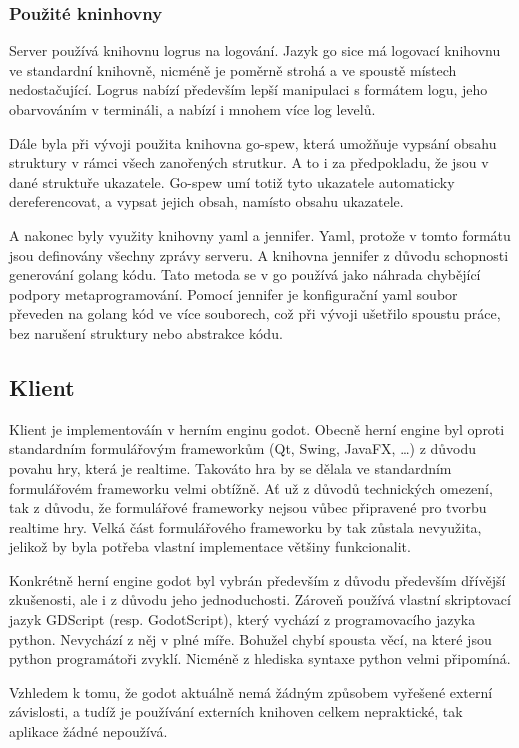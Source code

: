 \documentclass[12pt, a4paper]{article}
\begin{document}
    \subsubsection{Použité kninhovny}
    Server používá knihovnu logrus na logování.
    Jazyk go sice má logovací knihovnu ve standardní knihovně, nicméně je poměrně strohá a ve spoustě místech nedostačující.
    Logrus nabízí především lepší manipulaci s formátem logu, jeho obarvováním v termináli, a nabízí i mnohem více log levelů.

    Dále byla při vývoji použita knihovna go-spew, která umožňuje vypsání obsahu struktury v rámci všech zanořených strutkur.
    A to i za předpokladu, že jsou v dané struktuře ukazatele.
    Go-spew umí totiž tyto ukazatele automaticky dereferencovat, a vypsat jejich obsah, namísto obsahu ukazatele.

    A nakonec byly využity knihovny yaml a jennifer.
    Yaml, protože v tomto formátu jsou definovány všechny zprávy serveru.
    A knihovna jennifer z důvodu schopnosti generování golang kódu.
    Tato metoda se v go používá jako náhrada chybějící podpory metaprogramování.
    Pomocí jennifer je konfigurační yaml soubor převeden na golang kód ve více souborech, což při vývoji ušetřilo spoustu práce, bez narušení struktury nebo abstrakce kódu.

    \subsection{Klient}
    Klient je implementováín v herním enginu godot.
    Obecně herní engine byl oproti standardním formulářovým frameworkům (Qt, Swing, JavaFX, \dots) z důvodu povahu hry, která je realtime.
    Takováto hra by se dělala ve standardním formulářovém frameworku velmi obtížně.
    Ať už z důvodů technických omezení, tak z důvodu, že formulářové frameworky nejsou vůbec připravené pro tvorbu realtime hry.
    Velká část formulářového frameworku by tak zůstala nevyužita, jelikož by byla potřeba vlastní implementace většiny funkcionalit.

    Konkrétně herní engine godot byl vybrán především z důvodu především dřívější zkušenosti, ale i z důvodu jeho jednoduchosti.
    Zároveň používá vlastní skriptovací jazyk GDScript (resp. GodotScript), který vychází z programovacího jazyka python.
    Nevychází z něj v plné míře. Bohužel chybí spousta věcí, na které jsou python programátoři zvyklí. Nicméně z hlediska syntaxe python velmi připomíná.

    Vzhledem k tomu, že godot aktuálně nemá žádným způsobem vyřešené externí závislosti, a tudíž je používání externích knihoven celkem nepraktické, tak aplikace žádné nepoužívá.
\end{document}
